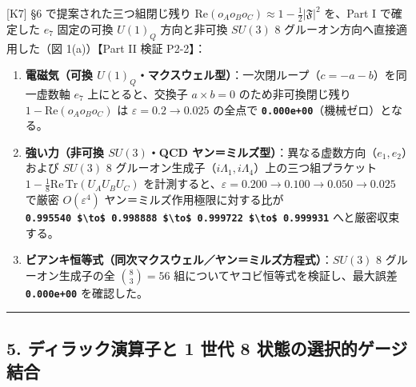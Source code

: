 \documentclass[
  a4paper,
]{ltjsarticle}
\providecommand{\tightlist}{%
  \setlength{\itemsep}{0pt}\setlength{\parskip}{0pt}}
\begin{document}
{[}K7{]} §6 で提案された三つ組閉じ残り
\(\mathrm{Re}(o_A o_B o_C) \approx 1 - \frac{1}{2}|\mathfrak{F}|^2\)
を、Part I で確定した \(e_7\) 固定の可換 \(U(1)_Q\) 方向と非可換
\(SU(3)\) 8 グルーオン方向へ直接適用した（図 1(a)）【Part II 検証
P2-2】：

\begin{enumerate}
\def\labelenumi{\arabic{enumi}.}
\tightlist
\item
  \textbf{電磁気（可換
  \(U(1)_Q\)・マクスウェル型）}：一次閉ループ（\(c = -a-b\)）を同一虚数軸
  \(e_7\) 上にとると、交換子 \(a \times b = 0\) のため非可換閉じ残り
  \(1 - \mathrm{Re}(o_A o_B o_C)\) は \(\varepsilon = 0.2 \to 0.025\)
  の全点で \textbf{\texttt{0.000e+00}}（機械ゼロ）となる。
\item
  \textbf{強い力（非可換 \(SU(3)\)・QCD
  ヤン＝ミルズ型）}：異なる虚数方向（\(e_1, e_2\)）および \(SU(3)\) 8
  グルーオン生成子（\(i\Lambda_1, i\Lambda_4\)）上の三つ組プラケット
  \(1 - \frac{1}{8}\mathrm{Re}\,\mathrm{Tr}(U_A U_B U_C)\)
  を計測すると、\(\varepsilon = 0.200 \to 0.100 \to 0.050 \to 0.025\)
  で厳密 \(O(\varepsilon^4)\) ヤン＝ミルズ作用極限に対する比が
  \textbf{\texttt{0.995540\ \$\textbackslash{}to\$\ 0.998888\ \$\textbackslash{}to\$\ 0.999722\ \$\textbackslash{}to\$\ 0.999931}}
  へと厳密収束する。
\item
  \textbf{ビアンキ恒等式（同次マクスウェル／ヤン＝ミルズ方程式）}：\(SU(3)\)
  8 グルーオン生成子の全 \(\binom{8}{3} = 56\)
  組についてヤコビ恒等式を検証し、最大誤差 \textbf{\texttt{0.000e+00}}
  を確認した。
\end{enumerate}

\begin{center}\rule{0.5\linewidth}{0.5pt}\end{center}

\subsection{5. ディラック演算子と 1 世代 8
状態の選択的ゲージ結合}\label{ux30c7ux30a3ux30e9ux30c3ux30afux6f14ux7b97ux5b50ux3068-1-ux4e16ux4ee3-8-ux72b6ux614bux306eux9078ux629eux7684ux30b2ux30fcux30b8ux7d50ux5408}
\end{document}
